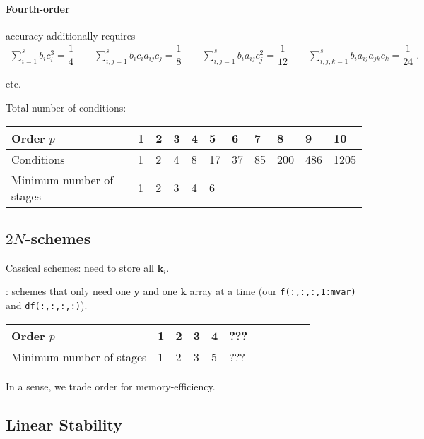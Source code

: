 \documentclass[\mydriver,12pt,twoside,notitlepage]{article}
\newcommand{\Code}[1]{{\color{DarkishMagenta}\texttt{#1}}}
\newcommand{\kv}      {\mathbf{k}}
\newcommand{\yv}{\mathbf{y}}
\begin{document}
%
\paragraph{Fourth-order} accuracy additionally requires
\begin{eqnarray}
  \sum\limits_{i=1}^{s} b_{i} c_i^3                  =  \dfrac{1}{4}
  \qquad
  \sum\limits_{i,j=1}^{s} b_{i} c_{i} a_{ij} c_j     =  \dfrac{1}{8}
  \qquad
  \sum\limits_{i,j=1}^{s} b_{i} a_{ij} c_j^2         =  \dfrac{1}{12}
  \qquad
  \sum\limits_{i,j,k=1}^{s} b_{i} a_{ij} a_{jk} c_k  =  \dfrac{1}{24} \; .  
\end{eqnarray}

\medskip
etc.
\medskip

Total number of conditions:
\begin{center}
  \begin{tabular}{lllllllllll}
  \toprule
    Order $p$  & 1 & 2 & 3 & 4 &  5 &  6 &  7 &   8 &  9  &   10\\
  \midrule
    Conditions & 1 & 2 & 4 & 8 & 17 & 37 & 85 & 200 & 486 & 1205\\
  \midrule
    Minimum number of stages & 1 & 2 & 3 & 4 & 6 & \\
  \bottomrule
  \end{tabular}
\end{center}


\subsection{$2N$-schemes}

Cassical schemes: need to store all $\kv_i$.

\medskip

\cite{Williamson:LowStorage}: schemes that only need one $\yv$ and one
$\kv$ array at a time (our \Code{f(:,:,:,1:mvar)} and \Code{df(:,:,:,:)}).

\medskip

\begin{center}
  \begin{tabular}{lllllllllll}
  \toprule
    Order $p$  & 1 & 2 & 3 & 4 & ??? \\
  \midrule
    Minimum number of stages & 1 & 2 & 3 & 5 & ??? & \\
  \bottomrule
  \end{tabular}
\end{center}

In a sense, we trade order for memory-efficiency.

\subsection{Linear Stability}
\end{document}
